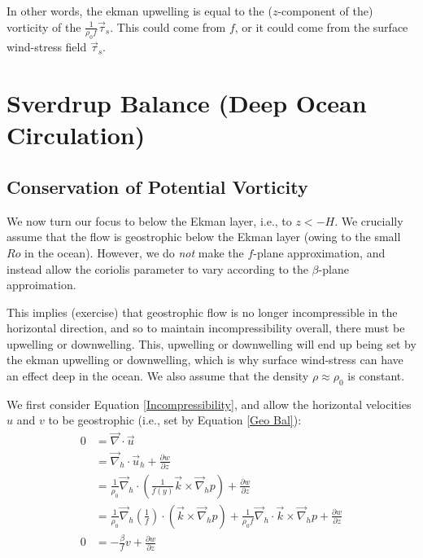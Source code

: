 In other words, the ekman upwelling is equal to the ($z$-component of the) vorticity of the $\frac{1}{\rho_0 f}\vec{\tau}_s$. This could come from $f$, or it could come from the surface wind-stress field $\vec{\tau}_s$. 

\section{Sverdrup Balance (Deep Ocean Circulation)}\label{Sverdrup Balance}

\subsection{Conservation of Potential Vorticity}

We now turn our focus to below the Ekman layer, i.e., to $z<-H$. We crucially assume that the flow is geostrophic below the Ekman layer (owing to the small $Ro$ in the ocean). However, we do \textit{not} make the $f$-plane approximation, and instead allow the coriolis parameter to vary according to the $\beta$-plane approimation. 

This implies (exercise) that geostrophic flow is no longer incompressible in the horizontal direction, and so to maintain incompressibility overall, there must be upwelling or downwelling. This, upwelling or downwelling will end up being set by the ekman upwelling or downwelling, which is why surface wind-stress can have an effect deep in the ocean. We also assume that the density $\rho\approx\rho_0$ is constant.

We first consider Equation \ref{Incompressibility}, and allow the horizontal velocities $u$ and $v$ to be geostrophic (i.e., set by Equation \ref{Geo Bal}):
\begin{align*}
    0 & = \vec{\nabla}\cdot\vec{u}
    \\
    &= \vec{\nabla}_h\cdot\vec{u}_h
    +\frac{\partial w}{\partial z}
    \\
    &= 
    \frac{1}{\rho_0}\vec{\nabla}_h\cdot\left( \frac{1}{f(y)}\vec{k}\times\vec{\nabla}_h p \right)+\frac{\partial w}{\partial z}
    \\
    &=
    \frac{1}{\rho_0}
    \vec{\nabla}_h\left( \frac{1}{f} \right)
    \cdot \left( \vec{k}\times\vec{\nabla}_h p \right)
    +
    \frac{1}{\rho_0 f}
    \vec{\nabla}_h
    \cdot \vec{k}\times\vec{\nabla}_h p
    +\frac{\partial w}{\partial z}
    \\
    0&=-\frac{\beta}{f}v+\frac{\partial w}{\partial z}
\end{align*}

